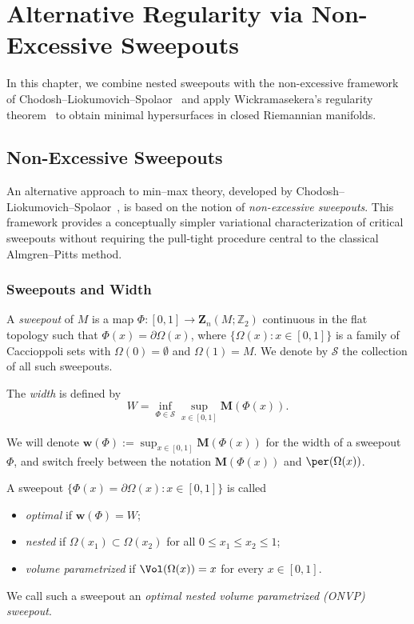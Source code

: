 \chapter{Alternative Regularity via Non-Excessive Sweepouts}\label{ch:alternative-regularity}

In this chapter, we combine nested sweepouts with the non-excessive framework of Chodosh--Liokumovich--Spolaor~\cite{CLS22} and apply Wickramasekera's regularity theorem~\cite{Wic14} to obtain minimal hypersurfaces in closed Riemannian manifolds.

\section{Non-Excessive Sweepouts}\label{sec:non-excessive-prelim}
An alternative approach to min--max theory, developed by Chodosh--Liokumovich--Spolaor~\cite{CLS22}, is based on the notion of \emph{non-excessive sweepouts}. This framework provides a conceptually simpler variational characterization of critical sweepouts without requiring the pull-tight procedure central to the classical Almgren--Pitts method.

\subsection{Sweepouts and Width}

\begin{definition}[Sweepout]\label{def:sweepout-cls}
A \emph{sweepout} of $M$ is a map $\Phi: [0,1] \to \mathbf{Z}_{n}(M; \mathbb{Z}_2)$ continuous in the flat topology such that $\Phi(x) = \partial \Omega(x)$, where $\{\Omega(x) : x\in [0,1]\}$ is a family of Caccioppoli sets with $\Omega(0) = \emptyset$ and $\Omega(1) = M$. We denote by $\mathcal{S}$ the collection of all such sweepouts.

The \emph{width} is defined by
\[
W = \inf_{\Phi \in \mathcal{S}} \sup_{x\in [0,1]} \mathbf{M}(\Phi(x)).
\]
\end{definition}

We will denote $\mathbf{w}(\Phi) := \sup_{x\in [0,1]} \mathbf{M}(\Phi(x))$ for the width of a sweepout $\Phi$, and switch freely between the notation $\mathbf{M}(\Phi(x))$ and $\per(\Omega(x))$.

\begin{definition}\label{def:onvp}
A sweepout $\{ \Phi(x) = \partial \Omega(x) : x\in[0,1]\}$ is called
\begin{itemize}
    \item \emph{optimal} if $\mathbf{w}(\Phi) = W$;
    \item \emph{nested} if $\Omega(x_1) \subset \Omega(x_2)$ for all $0\leq x_1 \leq x_2\leq 1$;
    \item \emph{volume parametrized} if $\Vol(\Omega(x)) = x$ for every $x\in [0,1]$.
\end{itemize}
We call such a sweepout an \emph{optimal nested volume parametrized (ONVP) sweepout}.
\end{definition}

